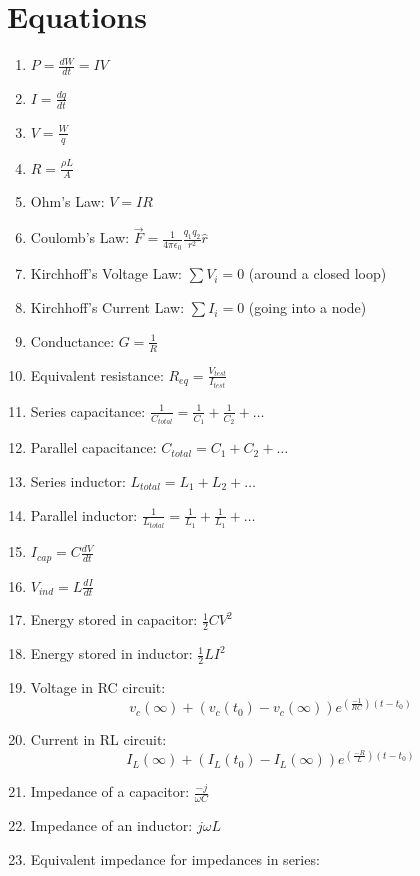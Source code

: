 \documentclass[twocolumn]{article}
\begin{document}
\section*{Equations}
\pagestyle{empty}

\begin{enumerate}
    \item $P = \frac{dW}{dt} = IV$
    \item $I = \frac{dq}{dt}$
    \item $V = \frac{W}{q}$
    \item $R = \frac{\rho L}{A}$
    \item Ohm's Law: $V=IR$
    \item Coulomb's Law: $\vec{F} = \frac{1}{4\pi \epsilon_0}\frac{q_1 q_2}{r^2}\hat{r}$
    \item Kirchhoff's Voltage Law: $\sum V_i = 0$ (around a closed loop)
    \item Kirchhoff's Current Law: $\sum I_i = 0$ (going into a node)
    \item Conductance: $G = \frac{1}{R}$
    \item Equivalent resistance: $R_{eq} = \frac{V_{test}}{I_{test}}$
    \item Series capacitance: $\frac{1}{C_{total}} = \frac{1}{C_1} + \frac{1}{C_2} + \dots$
    \item Parallel capacitance: $C_{total} = C_1 + C_2 + \dots$
    \item Series inductor: $L_{total} = L_1+L_2+\dots$
    \item Parallel inductor: $\frac{1}{L_{total}} = \frac{1}{L_1} + \frac{1}{L_1} + \dots$
    \item $I_{cap} = C \frac{dV}{dt}$
    \item $V_{ind} = L \frac{dI}{dt}$
    \item Energy stored in capacitor: $\frac{1}{2}CV^2$
    \item Energy stored in inductor: $\frac{1}{2}LI^2$
    \item Voltage in RC circuit: 
    \[v_c(\infty) +\left(v_c(t_0) - v_c(\infty)\right)e^{(\frac{-1}{RC})(t - t_0)}\]
    \item Current in RL circuit: 
    \[I_L(\infty) +\left(I_L(t_0) - I_L(\infty)\right)e^{(\frac{-R}{L})(t - t_0)}\]
    \item Impedance of a capacitor: $\frac{-j}{\omega C}$
    \item Impedance of an inductor: $j \omega L$
    \item Equivalent impedance for impedances in series: 

\end{enumerate}
\end{document}
